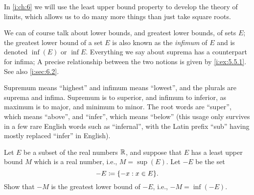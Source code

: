 \begin{rmk}\label{i:5.5.14}
  In \cref{i:ch:6} we will use the least upper bound property to develop the theory of limits, which allows us to do many more things than just take square roots.
\end{rmk}

\begin{rmk}\label{i:5.5.15}
  We can of course talk about lower bounds, and greatest lower bounds, of sets \(E\);
  the greatest lower bound of a set \(E\) is also known as the \emph{infimum} of \(E\) and is denoted \(\inf(E)\) or \(\inf E\).
  Everything we say about suprema has a counterpart for infima;
  A precise relationship between the two notions is given by \cref{i:ex:5.5.1}.
  See also \cref{i:sec:6.2}.
\end{rmk}

\begin{note}
  Supremum means ``highest'' and infimum means ``lowest'', and the plurals are suprema and infima.
  Supremum is to superior, and infimum to inferior, as maximum is to major, and minimum to minor.
  The root words are ``super'', which means ``above'', and ``infer'', which means ``below''
  (this usage only survives in a few rare English words such as ``infernal'', with the Latin prefix ``sub'' having mostly replaced ``infer'' in English).
\end{note}

\exercisesection

\begin{ex}\label{i:ex:5.5.1}
  Let \(E\) be a subset of the real numbers \(\mathbb{R}\), and suppose that \(E\) has a least upper bound \(M\) which is a real number, i.e., \(M = \sup(E)\).
  Let \(-E\) be the set
  \[
    -E \coloneqq \set{-x : x \in E}.
  \]
  Show that \(-M\) is the greatest lower bound of \(-E\), i.e., \(-M = \inf(-E)\).
\end{ex}


